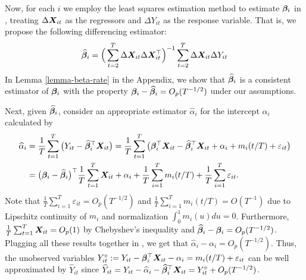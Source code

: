 \documentclass[a4paper,12pt]{article}
\makeatletter
\renewcommand{\eqref}[1]{\tagform@{\ref{#1}}}
\makeatother
\begin{document}
Now, for each $i$ we employ the least squares estimation method to estimate $\bm{\beta}_i$ in \eqref{model_with_regs}, treating $\Delta \boldsymbol{X}_{it}$ as the regressors and $\Delta Y_{it}$ as the response variable. That is, we propose the following differencing estimator:
\begin{align}\label{eq:beta:est}
\widehat{\bm{\beta}}_i = \Big( \sum_{t=2}^T \Delta \boldsymbol{X}_{it} \Delta \boldsymbol{X}_{it}^\top \Big)^{-1} \sum_{t=2}^T \Delta \boldsymbol{X}_{it} \Delta Y_{it}
\end{align}
In Lemma \ref{lemma-beta-rate} in the Appendix, we show that $\widehat{\bm{\beta}}_i$ is a consistent estimator of $\bm{\beta}_i$ with the property $\bm{\beta}_i - \widehat{\bm{\beta}}_i = O_p(T^{-1/2})$ under our assumptions. 

Next, given $\widehat{\bm{\beta}}_i$, consider an appropriate estimator $\widehat{\alpha}_{i}$ for the intercept $\alpha_i$ calculated by
\begin{align}
\widehat{\alpha}_i &= \frac{1}{T}\sum_{t=1}^T \big(Y_{it} - \widehat{\bm{\beta}}_i^\top \boldsymbol{X}_{it}\big) = \frac{1}{T}\sum_{t=1}^T \big(\bm{\beta}_i^\top \boldsymbol{X}_{it} - \widehat{\bm{\beta}}_i^\top \boldsymbol{X}_{it} + \alpha_i + m_i(t/T) + \varepsilon_{it}\big) \nonumber \\
&= \big(\bm{\beta}_i - \widehat{\bm{\beta}}_i \big)^\top\frac{1}{T}\sum_{t=1}^T  \boldsymbol{X}_{it} + \alpha_i + \frac{1}{T}\sum_{i=1}^T m_i(t/T) + \frac{1}{T}\sum_{i=1}^T \varepsilon_{it}. \label{eq:alpha:est}
\end{align}
Note that $\frac{1}{T}\sum_{i=1}^T \varepsilon_{it} = O_p(T^{-1/2})$ and $\frac{1}{T}\sum_{i=1}^T m_i(t/T) = O(T^{-1})$ due to Lipschitz continuity of $m_i$ and normalization $\int_{0}^1 m_i(u)du = 0$. Furthermore, $\frac{1}{T}\sum_{t=1}^T  \boldsymbol{X}_{it} = O_p(1)$ by Chebyshev's inequality and $\widehat{\bm{\beta}}_i - \bm{\beta}_i = O_p (T^{-1/2})$. Plugging all these results together in \eqref{eq:alpha:est}, we get that $\widehat{\alpha}_i - \alpha_i = O_p(T^{-1/2})$. Thus, the unobserved variables \linebreak $Y_{it}^\circ := Y_{it} - \bm{\beta}_i^\top \boldsymbol{X}_{it} - \alpha_i = m_i(t/T) + \varepsilon_{it}$ can be well approximated by $\widehat{Y}_{it} $ since \linebreak $\widehat{Y}_{it} = Y_{it} -\widehat{\alpha}_i - \widehat{\bm{\beta}}_i^\top \boldsymbol{X}_{it} = Y_{it}^\circ + O_p(T^{-1/2})$.
\end{document}
